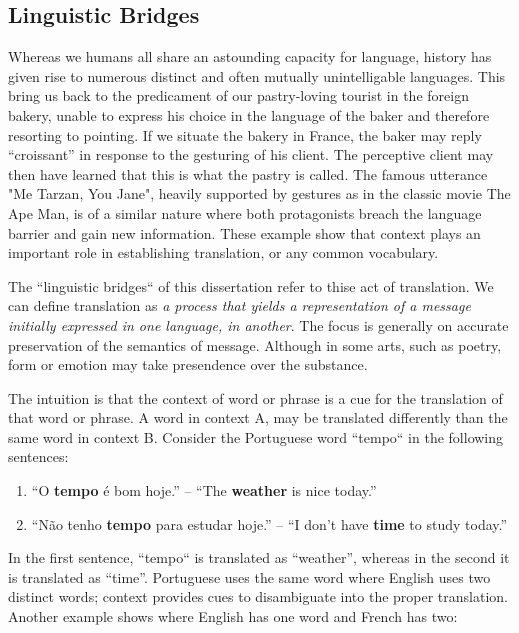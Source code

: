 \subsection{Linguistic Bridges}

Whereas we humans all share an astounding capacity for language, history has
given rise to numerous distinct and often mutually unintelligable languages.
This bring us back to the predicament of our pastry-loving tourist in the
foreign bakery, unable to express his choice in the language of the baker and
therefore resorting to pointing. If we situate the bakery in France, the baker
may reply ``croissant'' in response to the gesturing of his client. The
perceptive client may then have learned that this is what the pastry is called.
The famous utterance "Me Tarzan, You Jane", heavily supported by gestures as in
the classic movie The Ape Man, is of a similar nature where both protagonists
breach the language barrier and gain new information. These example show that context
plays an important role in establishing translation, or any common vocabulary. 

The ``linguistic bridges`` of this dissertation refer to thise act of translation. We can
define translation as \emph{a process that yields a representation of a message
initially expressed in one language, in another}. The focus is generally on accurate
preservation of the semantics of message. Although in some arts, such as poetry, form or
emotion may take presendence over the substance.

The intuition is that the context of word or phrase is a cue for the
translation of that word or phrase. A word in context A, may be translated
differently than the same word in context B. Consider the Portuguese word ``tempo`` in the following sentences:

\begin{enumerate}
\item ``O \textbf{tempo} é bom hoje.'' -- ``The \textbf{weather} is nice today.''
\item ``Não tenho \textbf{tempo} para estudar hoje.'' -- ``I don't have \textbf{time} to study today.''
\end{enumerate}

In the first sentence, ``tempo`` is translated as ``weather'', whereas in the
second it is translated as ``time''. Portuguese uses the same word where
English uses two distinct words; context provides cues to disambiguate into the
proper translation. Another example shows where English has one word and French has two:

